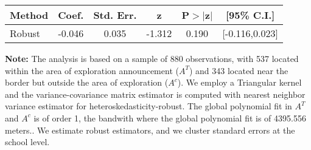 \begin{table}[htbp]\centering
 \footnotesize 
\begin{tabular}{lccccc}
\hline\hline
Method & Coef. & Std. Err. & z & P$>|$z$|$ & [95\% C.I.] \\ 
\hline \hline  
Robust & -0.046 & 0.035 & -1.312 & 0.190 & [-0.116,0.023] \\ 
  \hline\hline
\end{tabular}
\label{table:rd}
\begin{tablenotes} 
  \justifying \tiny \textbf{Note: }    
   The analysis is based on a sample of 880 observations, with 537 located within the area of exploration announcement ($A^{T}$) and 343 located near the border but outside the area of exploration  ($A^{c}$). 
           We employ a Triangular kernel and the variance-covariance matrix estimator is computed with nearest neighbor variance estimator for heteroskedasticity-robust. The global polynomial fit in  $A^{T}$ and $A^{c}$ is of order 1, the bandwith where the global polynomial fit is of 4395.556 meters.. We estimate robust estimators, and we cluster standard errors at the school level. \end{tablenotes} 
 \end{table} 
